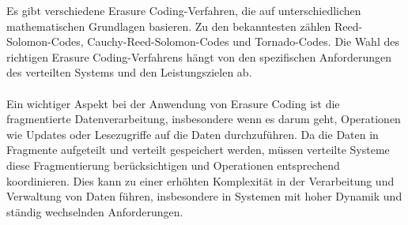 Es gibt verschiedene Erasure Coding-Verfahren, die auf unterschiedlichen mathematischen Grundlagen basieren. Zu den bekanntesten zählen Reed-Solomon-Codes, Cauchy-Reed-Solomon-Codes und Tornado-Codes. Die Wahl des richtigen Erasure Coding-Verfahrens hängt von den spezifischen Anforderungen des verteilten Systems und den Leistungszielen ab.
\\\\
Ein wichtiger Aspekt bei der Anwendung von Erasure Coding ist die fragmentierte Datenverarbeitung, insbesondere wenn es darum geht, Operationen wie Updates oder Lesezugriffe auf die Daten durchzuführen. Da die Daten in Fragmente aufgeteilt und verteilt gespeichert werden, müssen verteilte Systeme diese Fragmentierung berücksichtigen und Operationen entsprechend koordinieren. Dies kann zu einer erhöhten Komplexität in der Verarbeitung und Verwaltung von Daten führen, insbesondere in Systemen mit hoher Dynamik und ständig wechselnden Anforderungen.

